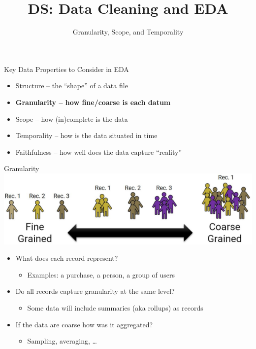 \documentclass[aspectratio=169]{../latex_main/tntbeamer}  %
\title[Introduction]{DS: Data Cleaning and EDA}
\subtitle{Granularity, Scope, and Temporality}
\begin{document}
	
	\maketitle
	
	\begin{frame}{Key Data Properties to Consider in EDA}
	    \begin{itemize}
	        \item Structure -- the “shape” of a data file
	        \item \textbf{Granularity -- how fine/coarse is each datum}
	        \item Scope -- how (in)complete is the data
	        \item Temporality -- how is the data situated in time
	        \item Faithfulness -- how well does the data capture “reality”
	    \end{itemize}
	\end{frame}
	
	
	
	\begin{frame}{Granularity}
	    \centering
	    \includegraphics[scale=.35]{Bild18}
	    \begin{itemize}
	        \item What does each record represent?
	        \begin{itemize}
	            \item Examples: a purchase, a person, a group of users
	        \end{itemize}
	        \item Do all records capture granularity at the same level?
	        \begin{itemize}
	            \item Some data will include summaries (aka rollups) as records
	        \end{itemize}
	        \item If the data are coarse how was it aggregated?
	        \begin{itemize}
	            \item Sampling, averaging, …
	        \end{itemize}
	    \end{itemize}
	\end{frame}
	
\end{document}
